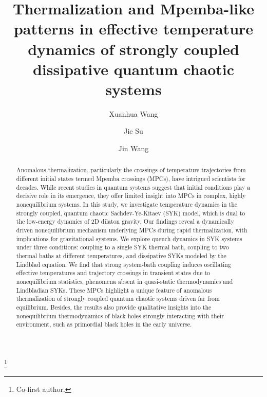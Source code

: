 \documentclass[prl,superscriptaddress,notitlepage,showpacs,twocolumn]{revtex4-2}
\begin{document}
\title{Thermalization and Mpemba-like patterns in effective temperature dynamics of strongly coupled dissipative quantum chaotic systems}
\author{Xuanhua Wang}


\author{Jie Su}
\thanks{Co-first author.}

\author{Jin Wang}

\begin{abstract}
Anomalous thermalization, particularly the crossings of temperature trajectories from different initial states termed Mpemba crossings (MPCs), have intrigued scientists for decades. While recent studies in quantum systems suggest that initial conditions play a decisive role in its emergence, they offer limited insight into MPCs in complex, highly nonequilibrium systems. In this study, we investigate temperature dynamics in the strongly coupled, quantum chaotic Sachdev-Ye-Kitaev (SYK) model, which is dual to the low-energy dynamics of 2D dilaton gravity. Our findings reveal a dynamically driven nonequilibrium mechanism underlying MPCs during rapid thermalization, with implications for gravitational systems. We explore quench dynamics in SYK systems under three conditions: coupling to a single SYK thermal bath, coupling to two thermal baths at different temperatures, and dissipative SYKs modeled by the Lindblad equation. We find that strong system-bath coupling induces oscillating effective temperatures and trajectory crossings in transient states due to nonequilibrium statistics, phenomena absent in quasi-static thermodynamics and Lindbladian SYKs. These MPCs highlight a unique feature of anomalous thermalization of strongly coupled quantum chaotic systems driven far from equilibrium. Besides, the results also provide qualitative insights into the nonequilibrium thermodynamics of black holes strongly interacting with their environment, such as primordial black holes in the early universe.
\end{abstract}
\end{document}

